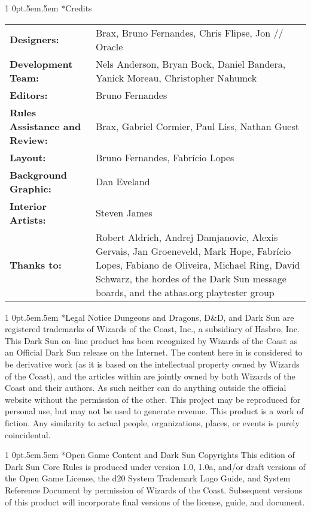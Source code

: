 \documentclass[onecolumn,oneside]{d20}
\makeatletter
\renewcommand\section{
  \@startsection{section}
  {1}
  {0pt}{.5em}{.5em}{\color{ChapterColor}\Large\scshape\raggedleft\imfellEnglish}
}
\makeatother
\begin{document}
\small
\section*{Credits}
\noindent\begin{tabularx}{\textwidth}{>{\bfseries}p{4cm} X}
  Designers: & Brax, Bruno Fernandes, Chris Flipse, Jon // Oracle \\
  Development Team: & Nels Anderson, Bryan Bock, Daniel Bandera, Yanick Moreau, Christopher Nahumck \\
  Editors: & Bruno Fernandes \\
  Rules Assistance and Review: & Brax, Gabriel Cormier, Paul Liss, Nathan Guest \\
  Layout: & Bruno Fernandes, Fabr\'icio Lopes \\
  Background Graphic: & Dan Eveland \\
  Interior Artists: & Steven James \\
  Thanks to: & Robert Aldrich, Andrej Damjanovic, Alexis Gervais, Jan Groeneveld, Mark Hope, Fabr\'icio Lopes, Fabiano de Oliveira, Michael Ring, David Schwarz, the hordes of the Dark Sun message boards, and the athas.org playtester group \\
\end{tabularx}

\section*{Legal Notice}
Dungeons and Dragons\textregistered, D\&D, and {Dark Sun\textregistered}  are registered trademarks of Wizards of the Coast, Inc., a subsidiary of Hasbro, Inc. This Dark Sun on--line product has been recognized by Wizards of the Coast as an Official Dark Sun release on the Internet. The content here in is considered to be derivative work (as it is based on the intellectual property owned by Wizards of the Coast), and the articles within are jointly owned by both Wizards of the Coast and their authors. As such neither can do anything outside the official website without the permission of the other. This project may be reproduced for personal use, but may not be used to generate revenue. This product is a work of fiction. Any similarity to actual people, organizations, places, or events is purely coincidental.

\section*{Open Game Content and Dark Sun Copyrights}
This edition of Dark Sun Core Rules is produced under version 1.0, 1.0a, and/or draft versions of the Open Game License, the d20 System Trademark Logo Guide, and System Reference Document by permission of Wizards of the Coast. Subsequent versions of this product will incorporate final versions of the license, guide, and document.
\end{document}
